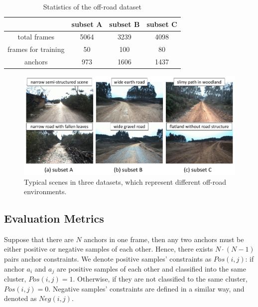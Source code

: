 \documentclass[letterpaper, 10 pt, conference]{ieeeconf}  %
\begin{document}
\begin{table}[h]
	\centering
	\caption{Statistics of the off-road dataset}
	\label{tab:dataset}
	\begin{tabular}{cccc} 
		\hline
		& subset A & subset B & subset C  \\ 
		\hline
		total frames        & 5064     & 3239     & 4098      \\
		frames for training & 50       & 100      & 80        \\
		anchors       & 973      & 1606     & 1437      \\
		\hline
	\end{tabular}
\end{table}

\begin{figure}[h]
	\centering
	\includegraphics[scale=0.28]{dataset.pdf}
	\caption{Typical scenes in three datasets, which represent different off-road environments.}
	\label{fig:dataset}
\end{figure}

\subsection{Evaluation Metrics}
Suppose that there are $N$ anchors in one frame, then any two anchors must be either positive or negative samples of each other. Hence, there exists $N \cdot(N-1)$ pairs anchor constraints.
We denote positive samples' constraints as $Pos(i,j)$: if anchor $a_i$ and $a_j$ are positive samples of each other and classified into the same cluster, $Pos(i,j)=1$. Otherwise, if they are not classified to the same cluster, $Pos(i,j)=0$.
Negative samples' constraints are defined in a similar way, and denoted as $Neg(i,j)$.
\end{document}

